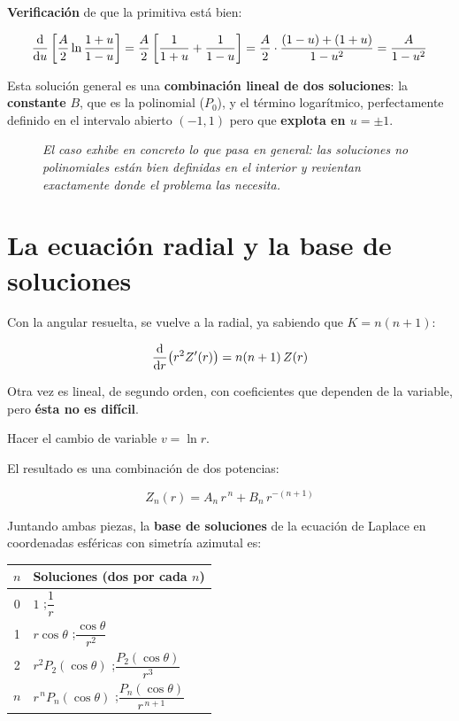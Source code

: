 \documentclass[12pt,a4paper]{article}
\begin{document}
\textbf{Verificación} de que la primitiva está bien:

\[
\dv{u}\left[\frac{A}{2}\ln\frac{1+u}{1-u}\right]
= \frac{A}{2}\left[\frac{1}{1+u} + \frac{1}{1-u}\right]
= \frac{A}{2}\cdot\frac{(1-u)+(1+u)}{1-u^2}
= \frac{A}{1-u^2}
\]

Esta solución general es una \textbf{combinación lineal de dos soluciones}: la
\textbf{constante} $B$, que es la polinomial ($P_0$), y el término logarítmico,
perfectamente definido en el intervalo abierto $(-1,1)$ pero que \textbf{explota
en $u=\pm1$}.

\begin{figure}[H]
  \centering
  
  \caption*{\small\itshape El caso exhibe en concreto lo que pasa en general: las
  soluciones no polinomiales están bien definidas en el interior y revientan
  exactamente donde el problema las necesita.}
\end{figure}

\section{La ecuación radial y la base de soluciones}

Con la angular resuelta, se vuelve a la radial, ya sabiendo que $K = n(n+1)$:

\[
\dv{r}\big(r^2 Z'(r)\big) = n(n+1)\,Z(r)
\]

Otra vez es lineal, de segundo orden, con coeficientes que dependen de la
variable, pero \textbf{ésta no es difícil}.

\begin{notebox}
Hacer el cambio de variable $v = \ln r$.
\end{notebox}

El resultado es una combinación de dos potencias:

\[
\boxed{\;Z_n(r) = A_n\,r^{\,n} + B_n\,r^{-(n+1)}\;}
\]

Juntando ambas piezas, la \textbf{base de soluciones} de la ecuación de Laplace en
coordenadas esféricas con simetría azimutal es:

\begin{table}[H]
  \centering
  \begin{tabular}{@{}cl@{}}
    \toprule
    $n$ & \textbf{Soluciones (dos por cada $n$)} \\
    \midrule
    0 & $1$ \quad;\quad $\dfrac{1}{r}$ \\[0.6em]
    1 & $r\cos\theta$ \quad;\quad $\dfrac{\cos\theta}{r^{2}}$ \\[0.6em]
    2 & $r^{2}P_2(\cos\theta)$ \quad;\quad $\dfrac{P_2(\cos\theta)}{r^{3}}$ \\[0.6em]
    $n$ & $r^{\,n}P_n(\cos\theta)$ \quad;\quad $\dfrac{P_n(\cos\theta)}{r^{\,n+1}}$ \\
    \bottomrule
  \end{tabular}
\end{table}
\end{document}
